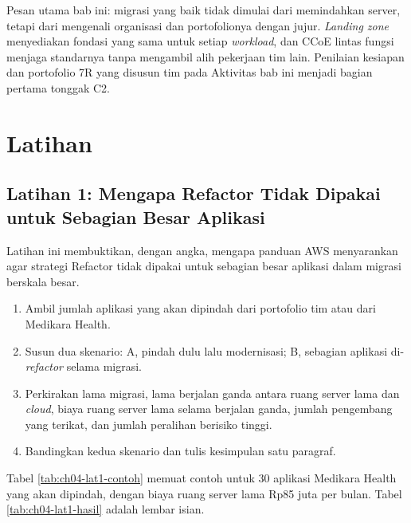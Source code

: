 Pesan utama bab ini: migrasi yang baik tidak dimulai dari memindahkan server, tetapi dari
mengenali organisasi dan portofolionya dengan jujur. \textit{Landing zone} menyediakan
fondasi yang sama untuk setiap \textit{workload}, dan CCoE lintas fungsi menjaga
standarnya tanpa mengambil alih pekerjaan tim lain. Penilaian kesiapan dan portofolio 7R
yang disusun tim pada Aktivitas bab ini menjadi bagian pertama tonggak C2.

\section{Latihan}

\subsection*{Latihan 1: Mengapa Refactor Tidak Dipakai untuk Sebagian Besar Aplikasi}

Latihan ini membuktikan, dengan angka, mengapa panduan AWS menyarankan agar strategi
Refactor tidak dipakai untuk sebagian besar aplikasi dalam migrasi berskala besar.

\begin{enumerate}
  \item Ambil jumlah aplikasi yang akan dipindah dari portofolio tim atau dari Medikara
        Health.
  \item Susun dua skenario: A, pindah dulu lalu modernisasi; B, sebagian aplikasi
        di-\textit{refactor} selama migrasi.
  \item Perkirakan lama migrasi, lama berjalan ganda antara ruang server lama dan
        \textit{cloud}, biaya ruang server lama selama berjalan ganda, jumlah pengembang
        yang terikat, dan jumlah peralihan berisiko tinggi.
  \item Bandingkan kedua skenario dan tulis kesimpulan satu paragraf.
\end{enumerate}

Tabel \ref{tab:ch04-lat1-contoh} memuat contoh untuk 30 aplikasi Medikara Health yang
akan dipindah, dengan biaya ruang server lama Rp85 juta per bulan. Tabel
\ref{tab:ch04-lat1-hasil} adalah lembar isian.

